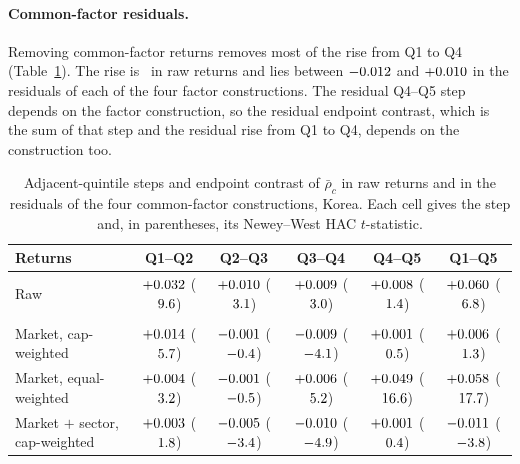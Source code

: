 \documentclass[a4paper,fleqn]{cas-sc}
\begin{document}
\paragraph{Common-factor residuals.}\label{subsec:residuals} Removing common-factor returns removes most of the rise from Q1 to Q4 (Table~\ref{tab:residual_steps}). The rise is \rhoCRiseQoneQfourHeadline\ in raw returns and lies between $-0.012$ and $+0.010$ in the residuals of each of the four factor constructions. The residual Q4--Q5 step depends on the factor construction, so the residual endpoint contrast, which is the sum of that step and the residual rise from Q1 to Q4, depends on the construction too.

\begin{table}[pos=htbp]
\centering
\begin{threeparttable}
\caption{Adjacent-quintile steps and endpoint contrast of $\bar\rho_c$ in raw returns and in the residuals of the four common-factor constructions, Korea. Each cell gives the step and, in parentheses, its Newey--West HAC $t$-statistic.}\label{tab:residual_steps}
\footnotesize
\setlength{\tabcolsep}{4pt}
\begin{tabular}{l ccccc}
\toprule
Returns & Q1--Q2 & Q2--Q3 & Q3--Q4 & Q4--Q5 & Q1--Q5 \\
\midrule
Raw & $+0.032$ ($9.6$) & $+0.010$ ($3.1$) & $+0.009$ ($3.0$) & $+0.008$ ($1.4$) & $+0.060$ ($6.8$) \\
\addlinespace
\multicolumn{6}{l}{\textit{Residual of}} \\
\quad Market, cap-weighted & $+0.014$ ($5.7$) & $-0.001$ ($-0.4$) & $-0.009$ ($-4.1$) & $+0.001$ ($0.5$) & $+0.006$ ($1.3$) \\
\quad Market, equal-weighted & $+0.004$ ($3.2$) & $-0.001$ ($-0.5$) & $+0.006$ ($5.2$) & $+0.049$ ($16.6$) & $+0.058$ ($17.7$) \\
\quad Market $+$ sector, cap-weighted & $+0.003$ ($1.8$) & $-0.005$ ($-3.4$) & $-0.010$ ($-4.9$) & $+0.001$ ($0.4$) & $-0.011$ ($-3.8$) \\

\end{tabular}
\end{threeparttable}
\end{table}
\end{document}
